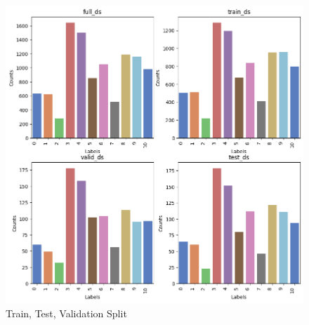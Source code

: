 \begin{figure}
    \centering
    \includegraphics[width=1\linewidth]{graphics//chapter 4/train test split.png}
    \caption{Train, Test, Validation Split}
    \label{fig:train-test-split}
\end{figure}

\newpage